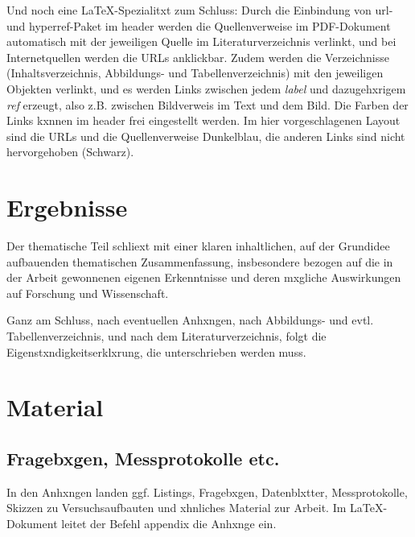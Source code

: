                 Und noch eine \LaTeX-Spezialitxt zum Schluss: Durch die Einbindung von url- und hyperref-Paket im header werden die Quellenverweise im PDF-Dokument automatisch mit der jeweiligen Quelle im Literaturverzeichnis verlinkt, und bei Internetquellen werden die URLs anklickbar. Zudem werden die Verzeichnisse (Inhaltsverzeichnis, Abbildungs- und Tabellenverzeichnis) mit den jeweiligen Objekten verlinkt, und es werden Links zwischen jedem \emph{label} und  dazugehxrigem \emph{ref} erzeugt, also z.B. zwischen Bildverweis im Text und dem Bild. Die Farben der Links kxnnen im header frei eingestellt werden. Im hier vorgeschlagenen Layout sind die URLs und die Quellenverweise Dunkelblau, die anderen Links sind nicht hervorgehoben (Schwarz). 


    \chapter{Ergebnisse}

        Der thematische Teil schliext mit einer klaren inhaltlichen, auf der Grundidee aufbauenden thematischen Zusammenfassung, insbesondere bezogen auf die in der Arbeit gewonnenen eigenen Erkenntnisse und deren mxgliche Auswirkungen auf Forschung und Wissenschaft. 

        Ganz am Schluss, nach eventuellen Anhxngen, nach Abbildungs- und evtl. Tabellenverzeichnis, und nach dem Literaturverzeichnis, folgt die Eigenstxndigkeitserklxrung, die unterschrieben werden muss.

    \appendix

        \chapter{Material}

            \section{Fragebxgen, Messprotokolle etc.}

                In den Anhxngen landen ggf. Listings, Fragebxgen, Datenblxtter, Messprotokolle, Skizzen zu Versuchsaufbauten und xhnliches Material zur Arbeit. Im \LaTeX-Dokument leitet der Befehl appendix die Anhxnge ein.


        \listoffigures %
        \listoftables %


     
    

    \clearpage\thispagestyle{empty}
    \eigen  %

